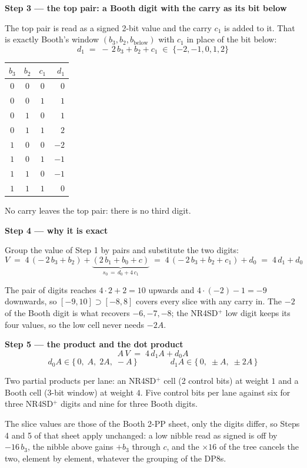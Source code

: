 \documentclass[fleqn]{article}
\begin{document}
\newpage

\noindent\textbf{Step 3 --- the top pair: a Booth digit with the carry as its bit below}

\noindent The top pair is read as a signed 2-bit value and the carry $c_1$ is added to it.
That is exactly Booth's window $(b_3, b_2, b_{\text{below}})$ with $c_1$ in place of the bit below:
\[
d_1 \;=\; -\,2\,b_3 + b_2 + c_1 \;\in\; \{-2, -1, 0, 1, 2\}
\]

\begin{center}
\renewcommand{\arraystretch}{1.35}
\begin{tabular}{c c c | r}
$b_3$ & $b_2$ & $c_1$ & $d_1$ \\
\hline
$0$ & $0$ & $0$ & $0$  \\
$0$ & $0$ & $1$ & $1$  \\
$0$ & $1$ & $0$ & $1$  \\
$0$ & $1$ & $1$ & $2$  \\
$1$ & $0$ & $0$ & $-2$ \\
$1$ & $0$ & $1$ & $-1$ \\
$1$ & $1$ & $0$ & $-1$ \\
$1$ & $1$ & $1$ & $0$  \\
\end{tabular}
\end{center}

\noindent No carry leaves the top pair: there is no third digit.

\vspace{0.5em}

\noindent\textbf{Step 4 --- why it is exact}

\noindent Group the value of Step 1 by pairs and substitute the two digits:
\[
V \;=\; 4\,(-\,2\,b_3 + b_2) + \underbrace{(2\,b_1 + b_0 + c)}_{s_0 \,=\, d_0 + 4\,c_1}
\;=\; 4\,(-\,2\,b_3 + b_2 + c_1) + d_0
\;=\; 4\,d_1 + d_0
\]

\noindent The pair of digits reaches $4 \cdot 2 + 2 = 10$ upwards and $4 \cdot (-2) - 1 = -9$
downwards, so $[-9, 10] \supset [-8, 8]$ covers every slice with any carry in. The
$-2$ of the Booth digit is what recovers $-6, -7, -8$; the NR4SD$^{+}$ low digit keeps
its four values, so the low cell never needs $-2A$.

\vspace{0.5em}

\noindent\textbf{Step 5 --- the product and the dot product}
\[
A\,V \;=\; 4\,d_1 A + d_0 A
\]
\[
d_0 A \in \{\, 0,\; A,\; 2A,\; -A \,\}
\qquad\qquad
d_1 A \in \{\, 0,\; \pm A,\; \pm 2A \,\}
\]

\noindent Two partial products per lane: an NR4SD$^{+}$ cell (2 control bits) at weight $1$
and a Booth cell (3-bit window) at weight $4$. Five control bits per lane against six for
three NR4SD$^{+}$ digits and nine for three Booth digits.

\noindent The slice values are those of the Booth 2-PP sheet, only the digits differ, so
Steps 4 and 5 of that sheet apply unchanged: a low nibble read as signed is off by
$-16\,b_3$, the nibble above gains $+b_3$ through $c$, and the $\times 16$ of the tree
cancels the two, element by element, whatever the grouping of the DP8s.
\end{document}
